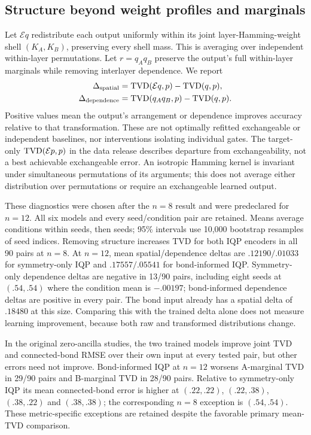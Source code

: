 \subsection{Structure beyond weight profiles and marginals}
\label{app:at-diagnostics}

Let $\mathcal E q$ redistribute each output uniformly within its joint layer-Hamming-weight shell $(K_A,K_B)$, preserving every shell mass. This is averaging over independent within-layer permutations. Let $r=q_Aq_B$ preserve the output's full within-layer marginals while removing interlayer dependence. We report
\begin{align}
 \Delta_{\rm spatial}&=\operatorname{TVD}(\mathcal E q,p)-\operatorname{TVD}(q,p),\\
 \Delta_{\rm dependence}&=\operatorname{TVD}(q_Aq_B,p)-\operatorname{TVD}(q,p).
\end{align}
Positive values mean the output's arrangement or dependence improves accuracy relative to that transformation. These are not optimally refitted exchangeable or independent baselines, nor interventions isolating individual gates. The target-only $\operatorname{TVD}(\mathcal E p,p)$ in the data release describes departure from exchangeability, not a best achievable exchangeable error. An isotropic Hamming kernel is invariant under simultaneous permutations of its arguments; this does not average either distribution over permutations or require an exchangeable learned output.

These diagnostics were chosen after the $n=8$ result and were predeclared for $n=12$. All six models and every seed/condition pair are retained. Means average conditions within seeds, then seeds; 95\% intervals use 10,000 bootstrap resamples of seed indices. Removing structure increases TVD for both IQP encoders in all 90 pairs at $n=8$. At $n=12$, mean spatial/dependence deltas are $.12190/.01033$ for symmetry-only IQP and $.17557/.05541$ for bond-informed IQP. Symmetry-only dependence deltas are negative in 13/90 pairs, including eight seeds at $(.54,.54)$ where the condition mean is $-.00197$; bond-informed dependence deltas are positive in every pair. The bond input already has a spatial delta of $.18480$ at this size. Comparing this with the trained delta alone does not measure learning improvement, because both raw and transformed distributions change.

In the original zero-ancilla studies, the two trained models improve joint TVD and connected-bond RMSE over their own input at every tested pair, but other errors need not improve. Bond-informed IQP at $n=12$ worsens A-marginal TVD in 29/90 pairs and B-marginal TVD in 28/90 pairs. Relative to symmetry-only IQP its mean connected-bond error is higher at $(.22,.22)$, $(.22,.38)$, $(.38,.22)$ and $(.38,.38)$; the corresponding $n=8$ exception is $(.54,.54)$. These metric-specific exceptions are retained despite the favorable primary mean-TVD comparison.

\clearpage


\clearpage
